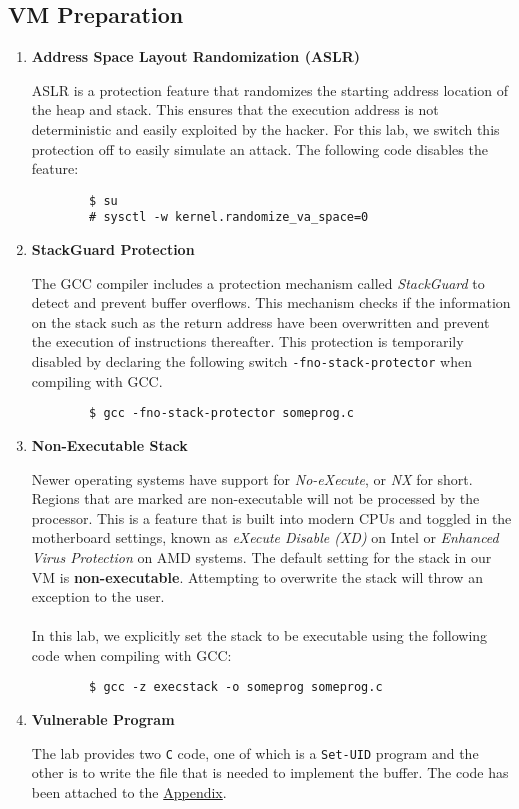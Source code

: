 \documentclass[a4paper,12pt]{article}
\begin{document}
\subsection{VM Preparation}
\vspace{1em}
\begin{enumerate}
	\item \textbf{Address Space Layout Randomization (ASLR)} \begin{par}ASLR is a protection feature that randomizes the starting address location of the heap and stack. This ensures that the execution address is not deterministic and easily exploited by the hacker. For this lab, we switch this protection off to easily simulate an attack. The following code disables the feature:
		\begin{verbatim}
		$ su
		# sysctl -w kernel.randomize_va_space=0
		\end{verbatim}
	\end{par}
	\item \textbf{StackGuard Protection}\begin{par}The GCC compiler includes a protection mechanism called \textit{StackGuard} to detect and prevent buffer overflows. This mechanism checks if the information on the stack such as the return address have been overwritten and prevent the execution of instructions thereafter. This protection is temporarily disabled by declaring the following switch \texttt{-fno-stack-protector} when compiling with GCC.\begin{verbatim}
		$ gcc -fno-stack-protector someprog.c\end{verbatim}
	\end{par}
	\item \textbf{Non-Executable Stack}\begin{par}Newer operating systems have support for \textit{No-eXecute}, or \textit{NX} for short. Regions that are marked are non-executable will not be processed by the processor. This is a feature that is built into modern CPUs and toggled in the motherboard settings, known as \textit{eXecute Disable (XD)} on Intel or \textit{Enhanced Virus Protection} on AMD systems. The default setting for the stack in our VM is  \textbf{non-executable}. Attempting to overwrite the stack will throw an exception to the user. \\\\In this lab, we explicitly set the stack to be executable using the following code when compiling with GCC:
		\begin{verbatim}
		$ gcc -z execstack -o someprog someprog.c
		\end{verbatim}
	\end{par}
\item \textbf{Vulnerable Program}\begin{par}
The lab provides two \texttt{C} code, one of which is a \texttt{Set-UID} program and the other is to write the file that is needed to implement the buffer. The code has been attached to the \hyperref[App]{Appendix}.\end{par}
\end{enumerate}
\end{document}
